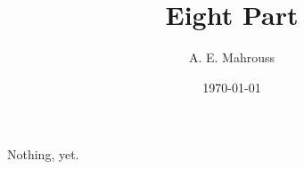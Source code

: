 \documentclass[10pt, twocolumn]{article}
\title{Eight Part}
\author{A. E. Mahrouss}
\date{\today}
\theoremstyle{plain}
\theoremstyle{definition}
\theoremstyle{remark}
\begin{document}
Nothing, yet.

\nocite{*}


\end{document}
